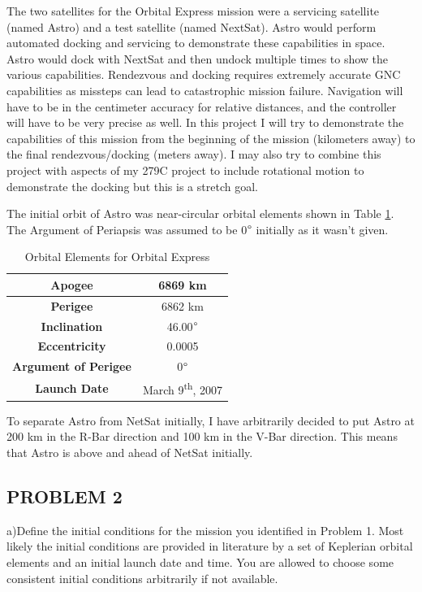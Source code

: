 \documentclass[12pt,a4paper,notitlepage]{article}
\begin{document}
The two satellites for the Orbital Express mission were a servicing satellite (named Astro) and a test satellite (named NextSat). Astro would perform automated docking and servicing to demonstrate these capabilities in space. Astro would dock with NextSat and then undock multiple times to show the various capabilities. Rendezvous and docking requires extremely accurate GNC capabilities as missteps can lead to catastrophic mission failure. Navigation will have to be in the centimeter accuracy for relative distances, and the controller will have to be very precise as well.  In this project I will try to demonstrate the capabilities of this mission from the beginning of the mission (kilometers away) to the final rendezvous/docking (meters away). I may also try to combine this project with aspects of my 279C project to include rotational motion to demonstrate the docking but this is a stretch goal. 

The initial orbit of Astro was near-circular orbital elements shown in Table \ref{table:orbital_elements}. The Argument of Periapsis was assumed to be 0\(\degree\) initially as it wasn't given.

\begin{table}[h!]
\begin{center}
\begin{tabular}{ |c|c| }
 \hline
 \textbf{Apogee} & 6869 km \\ \hline
 \textbf{Perigee} & 6862 km \\ \hline
 \textbf{Inclination} & 46.00\(\degree\) \\ \hline
 \textbf{Eccentricity} & 0.0005 \\ \hline
 \textbf{Argument of Perigee} & 0\(\degree\) \\ \hline
 \textbf{Launch Date} & March 9\textsuperscript{th}, 2007 \\ \hline
\end{tabular}
\caption{Orbital Elements for Orbital Express \cite{astro}}
\label{table:orbital_elements}
\end{center}
\end{table}

To separate Astro from NetSat initially, I have arbitrarily decided to put Astro at 200 km in the R-Bar direction and 100 km in the V-Bar direction. This means that Astro is above and ahead of NetSat initially.

\subsection{PROBLEM 2}
a)Define the initial conditions for the mission you identified in Problem 1. Most likely
the initial conditions are provided in literature by a set of Keplerian orbital elements
and an initial launch date and time. You are allowed to choose some consistent initial
conditions arbitrarily if not available.
\end{document}
